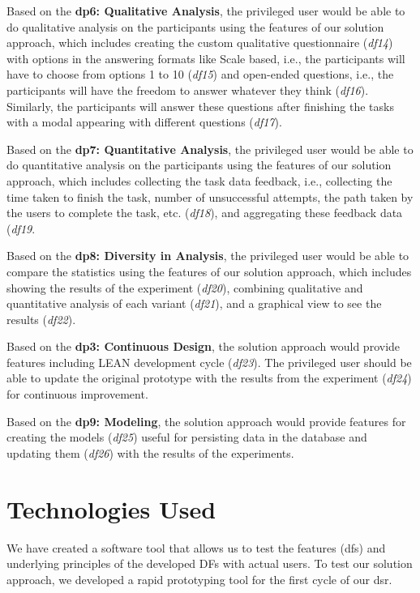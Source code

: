 Based on the \textbf{\ac{dp}6: Qualitative Analysis}, the privileged user would be able to do qualitative analysis on the participants using the features of our solution approach, which includes creating the custom qualitative questionnaire (\textit{\ac{df}14}) with options in the answering formats like Scale based, i.e., the participants will have to choose from options 1 to 10 (\textit{\ac{df}15}) and open-ended questions, i.e., the participants will have the freedom to answer whatever they think (\textit{\ac{df}16}). Similarly, the participants will answer these questions after finishing the tasks with a modal appearing with different questions (\textit{\ac{df}17}). 

Based on the \textbf{\ac{dp}7: Quantitative Analysis}, the privileged user would be able to do quantitative analysis on the participants using the features of our solution approach, which includes collecting the task data feedback, i.e., collecting the time taken to finish the task, number of unsuccessful attempts, the path taken by the users to complete the task, etc. (\textit{\ac{df}18}), and aggregating these feedback data (\textit{\ac{df}19}. 

Based on the \textbf{\ac{dp}8: Diversity in Analysis}, the privileged user would be able to compare the statistics using the features of our solution approach, which includes showing the results of the experiment (\textit{\ac{df}20}), combining qualitative and quantitative analysis of each variant (\textit{\ac{df}21}), and a graphical view to see the results (\textit{\ac{df}22}). 

Based on the \textbf{\ac{dp}3: Continuous Design}, the solution approach would provide features including LEAN development cycle (\textit{\ac{df}23}). The privileged user should be able to update the original prototype with the results from the experiment (\textit{\ac{df}24}) for continuous improvement. 

Based on the \textbf{\ac{dp}9: Modeling}, the solution approach would provide features for creating the models (\textit{\ac{df}25}) useful for persisting data in the database and updating them (\textit{\ac{df}26}) with the results of the experiments.

\section{Technologies Used}
\label{implementation:section:technologies}
We have created a software tool that allows us to test the features (\ac{df}s) and underlying principles of the developed DFs with actual users.
To test our solution approach, we developed a rapid prototyping tool for the first cycle of our \ac{dsr}. 

